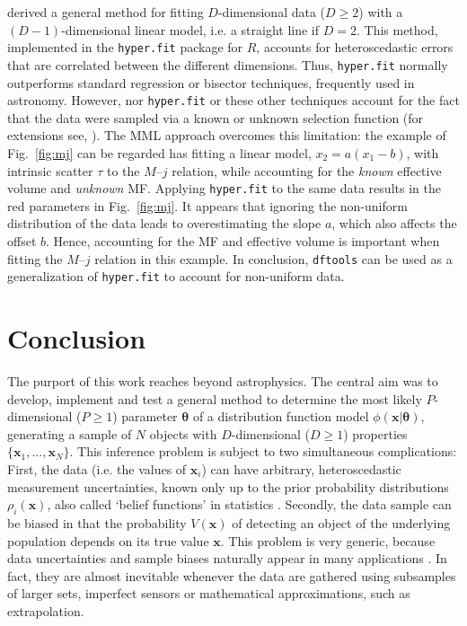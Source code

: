 \documentclass[a4paper,fleqn,usenatbib]{mnras}
\newcommand{\dftools}{\texttt{dftools}\xspace}
\newcommand{\hyperfit}{\texttt{hyper.fit}\xspace}
\newcommand{\veff}{V}%
\newcommand{\x}{\mathbf{x}}
\newcommand{\fig}[1]{Fig.~\ref{fig:#1}}
\newcommand{\ie}{i.e.\xspace}
\newcommand{\eg}{e.g.\xspace}
\newcommand{\para}{{\bm{\theta}}}
\begin{document}
\cite{Robotham2015} derived a general method for fitting $D$-dimensional data ($D\geq2$) with a $(D-1)$-dimensional linear model, \ie a straight line if $D=2$. This method, implemented in the \hyperfit package for $R$, accounts for heteroscedastic errors that are correlated between the different dimensions. Thus, \hyperfit normally outperforms standard regression or bisector techniques, frequently used in astronomy. However, nor \hyperfit or these other techniques account for the fact that the data were sampled via a known or unknown selection function (for extensions see, \citealp{Pihajoki2017}). The MML approach overcomes this limitation: the example of \fig{mj} can be regarded has fitting a linear model, $x_2=a(x_1-b)$, with intrinsic scatter $\tau$ to the $M$--$j$ relation, while accounting for the \emph{known} effective volume and \emph{unknown} MF. Applying \hyperfit to the same data results in the red parameters in \fig{mj}. It appears that ignoring the non-uniform distribution of the data leads to overestimating the slope $a$, which also affects the offset $b$. Hence, accounting for the MF and effective volume is important when fitting the $M$--$j$ relation in this example. In conclusion, \dftools can be used as a generalization of \hyperfit to account for non-uniform data. 


\section{Conclusion}\label{s:conclusion}

The purport of this work reaches beyond astrophysics. The central aim was to develop, implement and test a general method to determine the most likely $P$-dimensional ($P\geq1$) parameter $\para$ of a distribution function model $\phi(\x|\para)$, generating a sample of $N$ objects with $D$-dimensional ($D\geq1$) properties $\{\x_1,...,\x_N\}$. This inference problem is subject to two simultaneous complications: First, the data (\ie the values of $\x_i$) can have arbitrary, heteroscedastic measurement uncertainties, known only up to the prior probability distributions $\rho_i(\x)$, also called `belief functions' in statistics \citep{Denoeux2013}. Secondly, the data sample can be biased in that the probability $\veff(\x)$ of detecting an object of the underlying population depends on its true value $\x$. This problem is very generic, because data uncertainties and sample biases naturally appear in many applications \citep[\eg][]{Aggarwal2009}. In fact, they are almost inevitable whenever the data are gathered using subsamples of larger sets, imperfect sensors or mathematical approximations, such as extrapolation.
\end{document}

